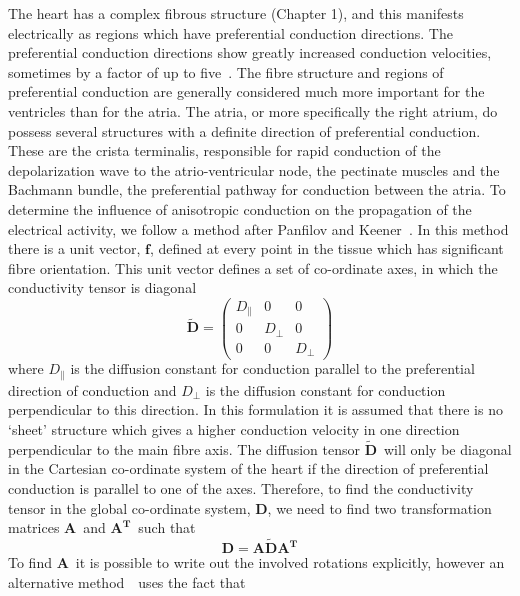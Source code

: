 The heart has a complex fibrous structure (Chapter 1), and this manifests
electrically as regions which have preferential conduction directions.
The preferential conduction directions show greatly increased conduction
velocities, sometimes by a factor of up to five~\cite{}.
The fibre structure and regions of preferential conduction are generally
considered much more important for the ventricles than for the atria.
The atria, or more specifically the right atrium, do possess several structures
with a definite direction of preferential conduction.
These are the crista terminalis, responsible for rapid conduction of the
depolarization wave to the atrio-ventricular node, the pectinate muscles and the
Bachmann bundle, the preferential pathway for conduction between the atria.
To determine the influence of anisotropic conduction on the propagation of the
electrical activity, we follow a method after Panfilov and
Keener~\cite{Panfilov1995}.
In this method there is a unit vector, $\mathbf{f}$, defined at every point in
the tissue which has significant fibre orientation.
This unit vector defines a set of co-ordinate axes, in which the conductivity
tensor is diagonal
\begin{equation}
\label{atrium:dtilde}
\mathbf{\tilde{D}} =
\begin{pmatrix}
D_{\parallel} & 0 & 0\\
0 & D_{\perp} & 0\\
0 & 0 & D_{\perp}
\end{pmatrix}
\end{equation}
where $D_{\parallel}$ is the diffusion constant for conduction parallel to the
preferential direction of conduction and $D_{\perp}$ is the diffusion constant
for conduction perpendicular to this direction.
In this formulation it is assumed that there is no `sheet' structure which gives
a higher conduction velocity in one direction perpendicular to the main fibre
axis.
The diffusion tensor $\mathbf{\tilde{D}}$\ will only be diagonal in the
Cartesian co-ordinate system of the heart if the direction of preferential
conduction is parallel to one of the axes.
Therefore, to find the conductivity tensor in the global co-ordinate system,
$\mathbf{D}$, we need to find two transformation matrices $\mathbf{A}$\ and
$\mathbf{A^{T}}$\ such that
\begin{equation}
\label{atrium:d}
\mathbf{D} = \mathbf{A} \mathbf{\tilde{D}} \mathbf{A^{T}}
\end{equation}
To find $\mathbf{A}$\ it is possible to write out the involved rotations
explicitly, however an alternative method~\cite{Fenton2005}\ uses the fact that

